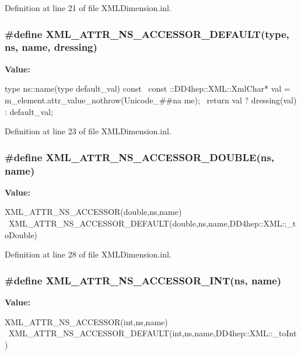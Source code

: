 Definition at line 21 of file XMLDimension.inl.\hypertarget{_x_m_l_dimension_8inl_a621d9cfc07f37e663ecb8f6c5bd22dfa}{
\subsubsection[{XML\_\-ATTR\_\-NS\_\-ACCESSOR\_\-DEFAULT}]{\setlength{\rightskip}{0pt plus 5cm}\#define XML\_\-ATTR\_\-NS\_\-ACCESSOR\_\-DEFAULT(type, \/  ns, \/  name, \/  dressing)}}
\label{_x_m_l_dimension_8inl_a621d9cfc07f37e663ecb8f6c5bd22dfa}
{\bfseries Value:}
\begin{DoxyCode}
type ns::name(type default_val) const {                 \
    const ::DD4hep::XML::XmlChar* val = m_element.attr_value_nothrow(Unicode_##na
      me); \
    return val ? dressing(val) : default_val; }
\end{DoxyCode}


Definition at line 23 of file XMLDimension.inl.\hypertarget{_x_m_l_dimension_8inl_a41ecea5c5f5c5ebc82e772c4dea4c97c}{
\subsubsection[{XML\_\-ATTR\_\-NS\_\-ACCESSOR\_\-DOUBLE}]{\setlength{\rightskip}{0pt plus 5cm}\#define XML\_\-ATTR\_\-NS\_\-ACCESSOR\_\-DOUBLE(ns, \/  name)}}
\label{_x_m_l_dimension_8inl_a41ecea5c5f5c5ebc82e772c4dea4c97c}
{\bfseries Value:}
\begin{DoxyCode}
XML_ATTR_NS_ACCESSOR(double,ns,name)                            \
  XML_ATTR_NS_ACCESSOR_DEFAULT(double,ns,name,DD4hep::XML::_toDouble)
\end{DoxyCode}


Definition at line 28 of file XMLDimension.inl.\hypertarget{_x_m_l_dimension_8inl_ad521d34a53e9f1ab96da2b2566438d95}{
\subsubsection[{XML\_\-ATTR\_\-NS\_\-ACCESSOR\_\-INT}]{\setlength{\rightskip}{0pt plus 5cm}\#define XML\_\-ATTR\_\-NS\_\-ACCESSOR\_\-INT(ns, \/  name)}}
\label{_x_m_l_dimension_8inl_ad521d34a53e9f1ab96da2b2566438d95}
{\bfseries Value:}
\begin{DoxyCode}
XML_ATTR_NS_ACCESSOR(int,ns,name)                               \
  XML_ATTR_NS_ACCESSOR_DEFAULT(int,ns,name,DD4hep::XML::_toInt)
\end{DoxyCode}


